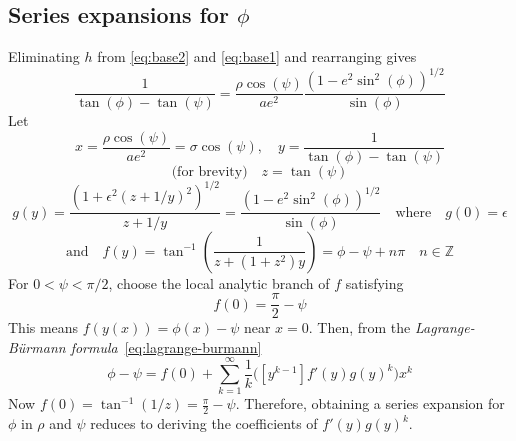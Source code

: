\documentclass[a4paper]{amsart}
\begin{document}
\subsection{Series expansions for \texorpdfstring{$\phi$}{φ}}\label{app:phi}
Eliminating $h$ from \eqref{eq:base2} and \eqref{eq:base1} and rearranging gives
\begin{equation*}
\frac{1}{\tan(\phi) - \tan(\psi)} = \frac{\rho\cos(\psi)}{ae^2}\frac{(1 - e^2\sin^2(\phi))^{1/2}}{\sin(\phi)}
\end{equation*}
Let
\begin{equation*}
x=\frac{\rho\cos(\psi)}{ae^2}=\sigma\cos(\psi), \quad y=\frac{1}{\tan(\phi) - \tan(\psi)}
\end{equation*}
\begin{equation*}
\text{(for brevity)}\quad z = \tan(\psi)
\end{equation*}
\begin{equation*}
g(y)=\frac{(1 + \epsilon^2(z+1/y)^2)^{1/2}}{z + 1/y}=\frac{(1 - e^2\sin^2(\phi))^{1/2}}{\sin(\phi)}\quad\text{where}\quad g(0)=\epsilon
\end{equation*}
\begin{equation*}
\text{and}\quad f(y)=\tan^{-1}\left(\frac{1}{z +(1+z^2)y}\right)=\phi-\psi + n\pi \quad n\in\mathbb{Z}
\end{equation*}
For $0<\psi<\pi/2$, choose the local analytic branch of $f$ satisfying
\begin{equation*}
f(0)=\frac{\pi}{2}-\psi
\end{equation*}
This means $f(y(x))=\phi(x)-\psi$ near $x=0$. Then, from the \emph{Lagrange-B\"{u}rmann formula}~\eqref{eq:lagrange-burmann}
\begin{equation}\label{eq:base4}
\phi-\psi = f(0) + \sum_{k=1}^\infty \frac{1}{k}\Big([y^{k-1}]f'(y)g(y)^k\Big) x^k
\end{equation}
Now $f(0)=\tan^{-1}(1/z)=\frac{\pi}{2}-\psi$. Therefore, obtaining a series expansion for $\phi$ in $\rho$ and $\psi$ reduces to deriving the coefficients of $f'(y)g(y)^k$.
\end{document}
